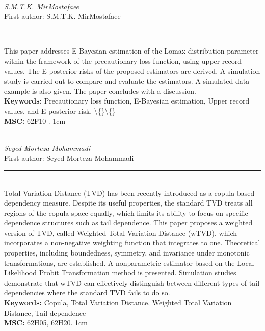 \documentclass[10pt,twoside]{article}
\begin{document}
\noindent\begin{minipage}[t][\textheight]{\textwidth}
\\[0.35em]
{\itshape S.M.T.K. MirMostafaee}\\[0.2em]
{\footnotesize First author: S.M.T.K. MirMostafaee}\\[0.45em]
\noindent\rule{\textwidth}{0.3pt}\\[0.4em]
{\footnotesize  This paper addresses E-Bayesian estimation of the Lomax distribution parameter within the framework of the precautionary loss function, using upper record values. The E-posterior risks of the proposed estimators are derived. A simulation study is carried out to compare and evaluate the estimators. A simulated data example is also given. The paper concludes with a discussion.}\\[0.4em]
{\footnotesize\bfseries Keywords:} {\footnotesize Precautionary loss function, E-Bayesian estimation, Upper record values, and E-posterior risk. \textbackslash\{\}\textbackslash\{\}}\\[0.15em]
{\footnotesize\bfseries MSC:} {\footnotesize 62F10 . 1cm}\\
\vfill
\end{minipage}
\newpage

\noindent\begin{minipage}[t][\textheight]{\textwidth}
\\[0.35em]
{\itshape Seyed Morteza Mohammadi}\\[0.2em]
{\footnotesize First author: Seyed Morteza Mohammadi}\\[0.45em]
\noindent\rule{\textwidth}{0.3pt}\\[0.4em]
{\footnotesize  Total Variation Distance (TVD) has been recently introduced as a copula-based dependency measure. Despite its useful properties, the standard TVD treats all regions of the copula space equally, which limits its ability to focus on specific dependence structures such as tail dependence. This paper proposes a weighted version of TVD, called Weighted Total Variation Distance (wTVD), which incorporates a non-negative weighting function that integrates to one. Theoretical properties, including boundedness, symmetry, and invariance under monotonic transformations, are established. A nonparametric estimator based on the Local Likelihood Probit Transformation method is presented. Simulation studies demonstrate that wTVD can effectively distinguish between different types of tail dependencies where the standard TVD fails to do so.}\\[0.4em]
{\footnotesize\bfseries Keywords:} {\footnotesize Copula, Total Variation Distance, Weighted Total Variation Distance, Tail dependence}\\[0.15em]
{\footnotesize\bfseries MSC:} {\footnotesize 62H05, 62H20. 1cm}\\
\vfill
\end{minipage}
\newpage
\end{document}
